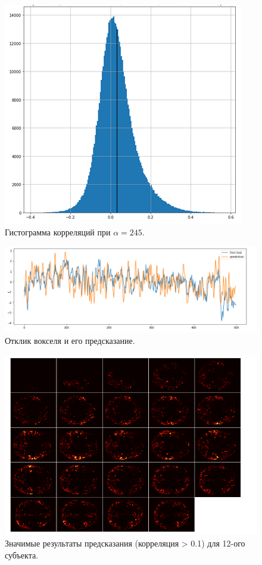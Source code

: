 \documentclass[pdftex,ptm,12pt,a4paper]{report}
\theoremstyle{definition}
\begin{document}
\begin{figure}[h]
\includegraphics[scale=0.6]{graphics/sub3_prep2.png}
\centering
\caption{Гистограмма корреляций при $\alpha=245$.}
\label{sub3_hist}
\end{figure}

\begin{figure}[h]
\includegraphics[scale=0.5]{graphics/sub3_prep2_bestvoxel.png}
\centering
\caption{Отклик вокселя и его предсказание.}
\label{sub3_bv}
\end{figure}

\begin{figure}[h]
\includegraphics[scale=0.65]{graphics/sub12_trunk01.png}
\centering
\caption{Значимые результаты предсказания (корреляция > 0.1) для 12-ого субъекта.}
\label{sub12_mosaic}
\end{figure}
\end{document}
